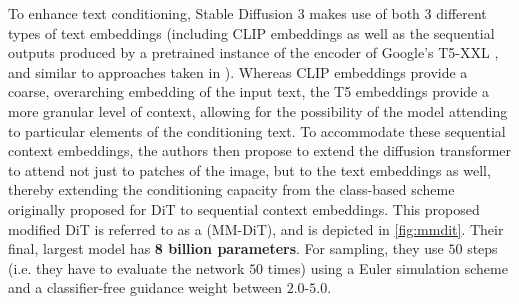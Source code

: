 To enhance text conditioning, Stable Diffusion 3 makes use of both 3 different types of text embeddings (including CLIP embeddings as well as the sequential outputs produced by a pretrained instance of the encoder of Google's T5-XXL \cite{t5}, and similar to approaches taken in \cite{balaji, saharia}). Whereas CLIP embeddings provide a coarse, overarching embedding of the input text, the T5 embeddings provide a more granular level of context, allowing for the possibility of the model attending to particular elements of the conditioning text. To accommodate these sequential context embeddings, the authors then propose to extend the diffusion transformer to attend not just to patches of the image, but to the text embeddings as well, thereby extending the conditioning capacity from the class-based scheme originally proposed for DiT to sequential context embeddings. This proposed modified DiT is referred to as a  (MM-DiT), and is depicted in \cref{fig:mmdit}. Their final, largest model has \textbf{8 billion parameters}. For sampling, they use $50$ steps (i.e. they have to evaluate the network $50$ times) using a Euler simulation scheme and a classifier-free guidance weight between $2.0$-$5.0$.

